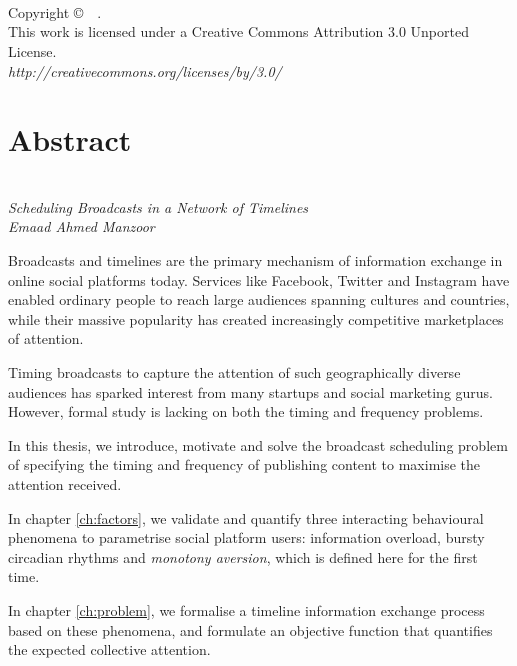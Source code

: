 \documentclass[onesided,letterpaper]{tufte-book}
\begin{document}
\chapter[Copyright]{}
\thispagestyle{fancy}
\begin{fullwidth}
~\vfill

Copyright \copyright\ \the\year\ \thanklessauthor.\\
This work is licensed under a Creative Commons Attribution 3.0 Unported License.\\
\textit{http://creativecommons.org/licenses/by/3.0/}
\end{fullwidth}

\chapter{Abstract}

\\[-2pc]
\textit{Scheduling Broadcasts in a Network of Timelines}\\
\textit{Emaad Ahmed Manzoor}


Broadcasts and timelines are the primary mechanism of information exchange in online social platforms today. Services like Facebook, Twitter and Instagram have enabled ordinary people to reach large audiences spanning cultures and countries, while their massive popularity has created increasingly competitive marketplaces of attention.

Timing broadcasts to capture the attention of such geographically diverse audiences has sparked interest from many startups and social marketing gurus. However, formal study is lacking on both the timing and frequency problems.

In this thesis, we introduce, motivate and solve the broadcast scheduling problem of specifying the timing and frequency of publishing content to maximise the attention received.

In chapter \ref{ch:factors}, we validate and quantify three interacting behavioural phenomena to parametrise social platform users: information overload, bursty circadian rhythms and \textit{monotony aversion}, which is defined here for the first time.

In chapter \ref{ch:problem}, we formalise a timeline information exchange process based on these phenomena, and formulate an objective function that quantifies the expected collective attention.
\end{document}
